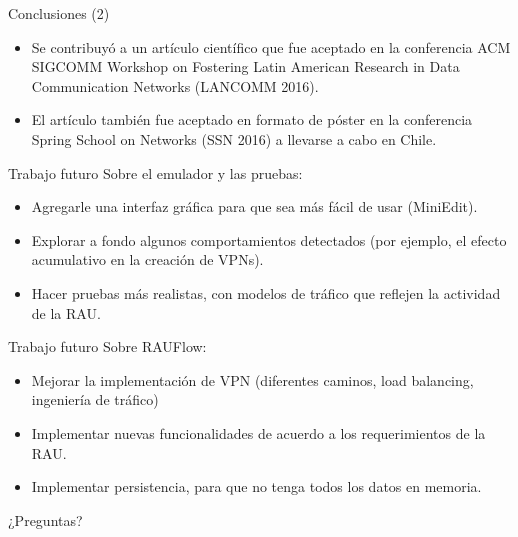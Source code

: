 \documentclass[xcolor=svgnames]{beamer}
\begin{document}
\begin{frame}{Conclusiones (2)}
	\begin{itemize}
		\item Se contribuyó a un artículo científico que fue aceptado en la conferencia ACM SIGCOMM Workshop on Fostering Latin American Research in Data Communication Networks (LANCOMM 2016).
		\item El artículo también fue aceptado en formato de póster en la conferencia Spring School on Networks (SSN 2016) a llevarse a cabo en Chile.
	\end{itemize}
\end{frame}

\begin{frame}{Trabajo futuro}
	Sobre el emulador y las pruebas:
	\begin{itemize}
		\item Agregarle una interfaz gráfica para que sea más fácil de usar (MiniEdit).
		\pause
		\item Explorar a fondo algunos comportamientos detectados (por ejemplo, el efecto acumulativo en la creación de VPNs).
		\pause
		\item Hacer pruebas más realistas, con modelos de tráfico que reflejen la actividad de la RAU.
	\end{itemize}
\end{frame}

\begin{frame}{Trabajo futuro}
	Sobre RAUFlow:
	\begin{itemize}
		\item Mejorar la implementación de VPN (diferentes caminos, load balancing, ingeniería de tráfico)
		\pause
		\item Implementar nuevas funcionalidades de acuerdo a los requerimientos de la RAU.
		\pause
		\item Implementar persistencia, para que no tenga todos los datos en memoria.
	\end{itemize}
\end{frame}

\begin{frame}{}
	\begin{center}
		{\huge ¿Preguntas?}
	\end{center}
\end{frame}
\end{document}
